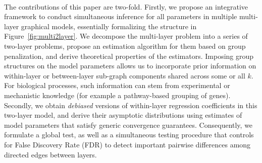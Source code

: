 \paragraph{}
%

The contributions of this paper are two-fold. Firstly, we propose an integrative framework to conduct simultaneous inference for all parameters in multiple multi-layer graphical models, essentially formalizing the structure in Figure~\ref{fig:multi2layer}. We decompose the multi-layer problem into a series of two-layer problems, propose an estimation algorithm for them based on group penalization, and derive theoretical properties of the estimators. Imposing group structures on the model parameters allows us to incorporate prior information on within-layer or between-layer sub-graph components shared across some or all $k$. For biological processes, such information can stem from experimental or mechanistic knowledge (for example a pathway-based grouping of genes). Secondly, we obtain {\em debiased} versions of within-layer regression coefficients in this two-layer model, and derive their asymptotic distributions using estimates of model parameters that satisfy generic convergence guarantees. Consequently, we formulate a global test, as well as a simultaneous testing procedure that controls for False Discovery Rate (FDR) to detect important pairwise differences among directed edges between layers.

